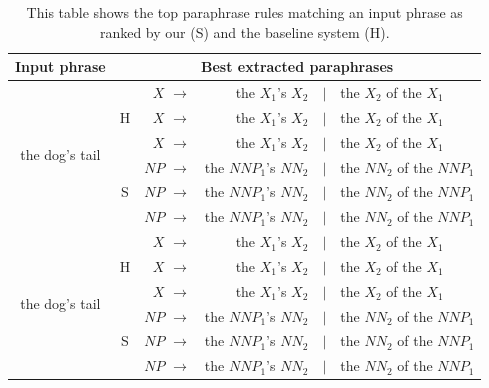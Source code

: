 \documentclass[11pt]{article}
\begin{document}
\begin{table}[t]
\begin{center}
\begin{tabular}{|c|c|rrcl|}
  \hline
  Input phrase & \multicolumn{5}{c|}{Best extracted paraphrases} \\
  \hline
  \multirow{6}{*}{the dog's tail} &
  \multirow{3}{*}{H}
  &
  $\mathit{X}$ $\rightarrow$  & the $\mathit{X}_1$'s
  $\mathit{X}_2$ & $\mid$ & the $\mathit{X}_2$ of the $\mathit{X}_1$
  \\
  &&
  $\mathit{X}$ $\rightarrow$  & the $\mathit{X}_1$'s
  $\mathit{X}_2$ & $\mid$ & the $\mathit{X}_2$ of the $\mathit{X}_1$
  \\
  &&
  $\mathit{X}$ $\rightarrow$  & the $\mathit{X}_1$'s
  $\mathit{X}_2$ & $\mid$ & the $\mathit{X}_2$ of the $\mathit{X}_1$ \\
  \cline{2-6}
  & \multirow{3}{*}{S}
  &
  $\mathit{NP}$ $\rightarrow$  & the $\mathit{NNP}_1$'s
  $\mathit{NN}_2$ & $\mid$ & the $\mathit{NN}_2$ of the $\mathit{NNP}_1$
  \\
  &&
  $\mathit{NP}$ $\rightarrow$  & the $\mathit{NNP}_1$'s
  $\mathit{NN}_2$ & $\mid$ & the $\mathit{NN}_2$ of the $\mathit{NNP}_1$
  \\
  &&
  $\mathit{NP}$ $\rightarrow$  & the $\mathit{NNP}_1$'s
  $\mathit{NN}_2$ & $\mid$ & the $\mathit{NN}_2$ of the
  $\mathit{NNP}_1$ \\
  \hline
  \multirow{6}{*}{the dog's tail} &
  \multirow{3}{*}{H}
  &
  $\mathit{X}$ $\rightarrow$  & the $\mathit{X}_1$'s
  $\mathit{X}_2$ & $\mid$ & the $\mathit{X}_2$ of the $\mathit{X}_1$
  \\
  &&
  $\mathit{X}$ $\rightarrow$  & the $\mathit{X}_1$'s
  $\mathit{X}_2$ & $\mid$ & the $\mathit{X}_2$ of the $\mathit{X}_1$  \\
  &&
  $\mathit{X}$ $\rightarrow$  & the $\mathit{X}_1$'s
  $\mathit{X}_2$ & $\mid$ & the $\mathit{X}_2$ of the $\mathit{X}_1$
  \\
  \cline{2-6}
  & \multirow{3}{*}{S}
  &
  $\mathit{NP}$ $\rightarrow$  & the $\mathit{NNP}_1$'s
  $\mathit{NN}_2$ & $\mid$ & the $\mathit{NN}_2$ of the $\mathit{NNP}_1$
  \\
  &&
  $\mathit{NP}$ $\rightarrow$  & the $\mathit{NNP}_1$'s
  $\mathit{NN}_2$ & $\mid$ & the $\mathit{NN}_2$ of the $\mathit{NNP}_1$
  \\
  &&
  $\mathit{NP}$ $\rightarrow$  & the $\mathit{NNP}_1$'s
  $\mathit{NN}_2$ & $\mid$ & the $\mathit{NN}_2$ of the
  $\mathit{NNP}_1$ \\
  \hline
\end{tabular}
\end{center}
\caption{This table shows the top paraphrase rules matching an input
  phrase as ranked by our (S) and the baseline system (H).}
\end{table}
\end{document}
